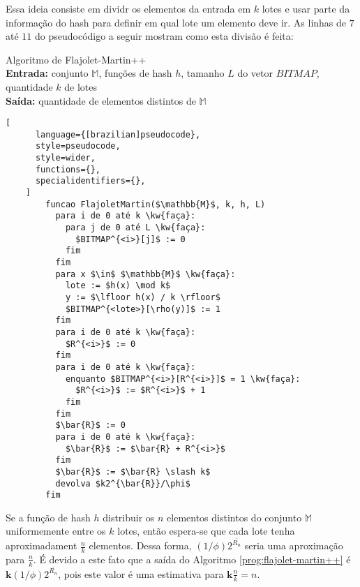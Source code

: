 Essa ideia consiste em dividr os elementos da entrada em $k$ lotes e usar parte da informação do hash para definir em 
qual lote um elemento deve ir. 
As linhas de $7$ até $11$ do pseudocódigo a seguir mostram como esta divisão é feita:
\begin{programruledcaption}{
  Algoritmo de Flajolet-Martin++
  \\ \textbf{Entrada:} conjunto $\mathbb{M}$, funções de hash $h$, tamanho $L$ do vetor $BITMAP$, 
  quantidade $k$ de lotes
  \\ \textbf{Saída:} quantidade de elementos distintos de $\mathbb{M}$
  \label{prog:flajolet-martin++}
  }
    \begin{lstlisting}[
      language={[brazilian]pseudocode},
      style=pseudocode,
      style=wider,
      functions={},
      specialidentifiers={},
    ]
        funcao FlajoletMartin($\mathbb{M}$, k, h, L)
          para i de 0 até k \kw{faça}:
            para j de 0 até L \kw{faça}:
              $BITMAP^{<i>}[j]$ := 0
            fim
          fim
          para x $\in$ $\mathbb{M}$ \kw{faça}:
            lote := $h(x) \mod k$
            y := $\lfloor h(x) / k \rfloor$
            $BITMAP^{<lote>}[\rho(y)]$ := 1
          fim
          para i de 0 até k \kw{faça}:
            $R^{<i>}$ := 0
          fim
          para i de 0 até k \kw{faça}:
            enquanto $BITMAP^{<i>}[R^{<i>}]$ = 1 \kw{faça}:
              $R^{<i>}$ := $R^{<i>}$ + 1
            fim
          fim
          $\bar{R}$ := 0
          para i de 0 até k \kw{faça}:
            $\bar{R}$ := $\bar{R} + R^{<i>}$ 
          fim
          $\bar{R}$ := $\bar{R} \slash k$
          devolva $k2^{\bar{R}}/\phi$
        fim
    \end{lstlisting}
  \end{programruledcaption}

Se a função de hash $h$ distribuir os $n$ elementos distintos do conjunto $\mathbb{M}$ uniformemente entre os 
$k$ lotes, então espera-se que cada lote tenha aproximadament $\frac{n}{k}$ elementos. Dessa forma, 
$(1 / \phi)2^{\bar{R_n}}$ seria uma aproximação para $\frac{n}{k}$. É devido a este fato que a saída do Algoritmo 
\ref{prog:flajolet-martin++} é $\mathbf{k} (1 / \phi)2^{\bar{R_n}}$, pois este valor é uma estimativa para 
$\mathbf{k} \frac{n}{k} = n$.

